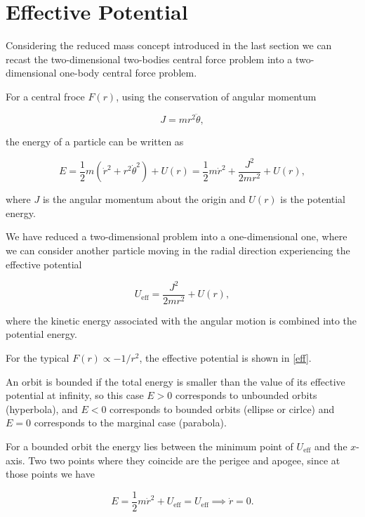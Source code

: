 \documentclass[a4paper,12pt]{report}
\begin{document}
\section{Effective Potential}

Considering the reduced mass concept introduced in the last section we can recast the two-dimensional two-bodies central force problem into a two-dimensional one-body central force problem.

For a central froce \(F(r)\), using the conservation of angular momentum 

\begin{equation}
	J = mr^2 \ddot{\theta }, 
\end{equation}

the energy of a particle can be written as 

\begin{equation}
	E = \frac{1}{2}m(\dot{r} ^2+ r^2 \dot{\theta }^2 ) + U(r) = \frac{1}{2}m\dot{r} ^2 + \frac{J^2}{2mr^2} + U(r), 
\end{equation}

where \(J\) is the angular momentum about the origin and \(U(r)\) is the potential energy. 

We have reduced a two-dimensional problem into a one-dimensional one, where we can consider another particle moving in the radial direction experiencing the effective potential 

\begin{equation}
	U_{\text{eff} } = \frac{J^2}{2mr^2} + U(r), 
\end{equation}

where the kinetic energy associated with the angular motion is combined into the potential energy.

For the typical \(F(r) \propto -1/r^2\), the effective potential is shown in \cref{eff}.


An orbit is bounded if the total energy is smaller than the value of its effective potential at infinity, so this case \(E > 0\) corresponds to unbounded orbits (hyperbola), and \(E < 0\) corresponds to bounded orbits (ellipse or cirlce) and \(E = 0\) corresponds to the marginal case (parabola). 

For a bounded orbit the energy lies between the minimum point of \(U_{\text{eff} } \) and the \(x\)-axis. Two two points where they coincide are the perigee and apogee, since at those points we have 

\begin{equation}
	E = \frac{1}{2}m \dot{r} ^2 + U_{\text{eff} } = U_{\text{eff} } \implies \dot{r} =0. 
\end{equation}
\end{document}
